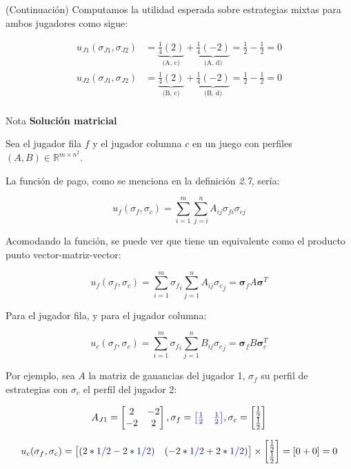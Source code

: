 \documentclass[12pt]{scrartcl}
\theoremstyle{definition}
\newcommand{\vect}[1]{\boldsymbol{#1}}
\begin{document}
\begin{exbox}{(Continuación)}
    Computamos la utilidad esperada sobre estrategias mixtas para ambos jugadores como sigue:
    \vspace{-0.6cm}
    
    \begin{align*}
        u_{J1}(\sigma_{J1}, \sigma_{J2}) & = \underbrace{\frac{1}{4}(2)}_\text{(A, c)} + \underbrace{\frac{1}{4}(-2)}_\text{(A, d)} = \frac{1}{2} - \frac{1}{2} = 0\\
        u_{J2}(\sigma_{J1}, \sigma_{J2}) & = \underbrace{ \frac{1}{4}(2)}_\text{(B, c)} + \underbrace{\frac{1}{4}(-2)}_\text{(B, d)} = \frac{1}{2} - \frac{1}{2} = 0\\
    \end{align*}
\end{exbox}

\begin{mybox}[colback=red!15]  {Nota}
    \textbf{Solución matricial}
    
    Sea el jugador fila $f$ y el jugador columna $c$ en un juego con perfiles $(A,B) \in \mathbb{R}^{m\times n^2}$. 

La función de pago, como se menciona en la definición \textit{2.7}, sería:

$$
u_f(\sigma_f, \sigma_c) = \sum_{i=1}^m\sum_{j=i}^n A_{ij}\sigma_{fi}\sigma_{cj}
$$

Acomodando la función, se puede ver que tiene un equivalente como el producto punto vector-matriz-vector:

$$
u_f(\sigma_f, \sigma_c) = \sum_{i=1}^m{\sigma_f}_i\sum_{j=1}^nA_{ij}{\sigma_c}_j = \vect{\sigma}_f A\vect{\sigma}^T
$$

Para el jugador fila, y para el jugador columna:

$$
u_c(\sigma_f, \sigma_c) = \sum_{i=1}^m{\sigma_f}_i\sum_{j=1}^nB_{ij}{\sigma_c}_j = \vect{\sigma}_f B\vect{\sigma}_c^T
$$

Por ejemplo, sea $A$ la matriz de ganancias del jugador 1, $\sigma_f$ su perfil de estrategias con $\sigma_c$ el perfil del jugador 2:

\[A_{J1}=
\begin{bmatrix}
2 & -2\\
-2 & 2
\end{bmatrix}, 
\sigma_f = 
{
\color{blue}
    \begin{bmatrix}
        \frac{1}{2} & \frac{1}{2}
    \end{bmatrix}
},
\sigma_c = 
\begin{bmatrix}
    \frac{1}{2}\\
    \frac{1}{2}
\end{bmatrix}
\]

\[
u_c(\sigma_f, \sigma_c) =%
\begin{bmatrix}
    (2 * {\color{blue}1/2} -2 * {\color{blue}1/2}) & (-2 * {\color{blue}1/2} + 2 * {\color{blue}1/2})
\end{bmatrix}%
\times
\begin{bmatrix}
    \frac{1}{2}\\
    \frac{1}{2}
\end{bmatrix} = [0 + 0] = 0
\]
    
\end{mybox}
\end{document}
